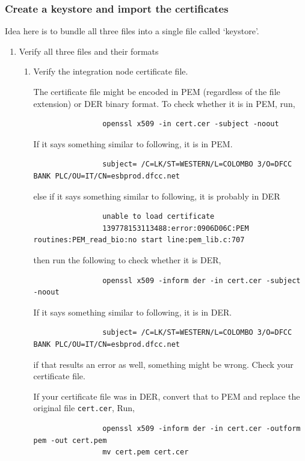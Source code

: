 \documentclass{article}
\begin{document}
    \subsubsection{Create a keystore and import the certificates}
    Idea here is to bundle all three files into a single file called `keystore'.

    \begin{enumerate}[itemsep=4ex]
        \item Verify all three files and their formats
        \begin{enumerate}[itemsep=3ex]
            \item Verify the integration node certificate file.


            The certificate file might be encoded in PEM (regardless of the file extension) or DER binary format. To check whether it is in PEM, run,
            \begin{lstlisting}
                openssl x509 -in cert.cer -subject -noout
            \end{lstlisting}
            If it says something similar to following, it is in PEM.
            \begin{lstlisting}
                subject= /C=LK/ST=WESTERN/L=COLOMBO 3/O=DFCC BANK PLC/OU=IT/CN=esbprod.dfcc.net
            \end{lstlisting}
            else if it says something similar to following, it is probably in DER
            \begin{lstlisting}
                unable to load certificate
                139778153113488:error:0906D06C:PEM routines:PEM_read_bio:no start line:pem_lib.c:707
            \end{lstlisting}
            then run the following to check whether it is DER,
            \begin{lstlisting}
                openssl x509 -inform der -in cert.cer -subject -noout
            \end{lstlisting}
            If it says something similar to following, it is in DER.
            \begin{lstlisting}
                subject= /C=LK/ST=WESTERN/L=COLOMBO 3/O=DFCC BANK PLC/OU=IT/CN=esbprod.dfcc.net
            \end{lstlisting}
            if that results an error as well, something might be wrong. Check your certificate file.

            
            If your certificate file was in DER, convert that to PEM and replace the original file \texttt{cert.cer}, Run,
            \begin{lstlisting}
                openssl x509 -inform der -in cert.cer -outform pem -out cert.pem
                mv cert.pem cert.cer
            \end{lstlisting}


\end{enumerate}
\end{enumerate}
\end{document}
